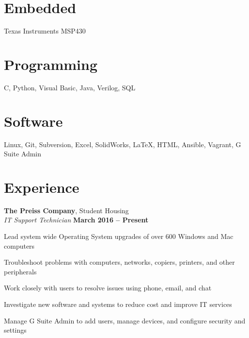 \documentclass[margin,line]{resume}
\begin{document}
\address{4232 Palafox Ct. Raleigh, NC 27604 | (704) 799-5153 | jesseaster1@gmail.com}
\begin{resume}

   
    \section{\mysidestyle Embedded}
    Texas Instruments MSP430
    \vspace{-5mm}
    
    \section{\mysidestyle Programming}
    C, Python, Visual Basic, Java, Verilog, SQL
    \vspace{-5mm}

    \section{\mysidestyle Software}
    Linux, Git, Subversion, Excel, SolidWorks, \LaTeX, HTML, Ansible, Vagrant, G Suite Admin

    \section{\mysidestyle Experience}


    \textbf{The Preiss Company}, Student Housing\\
    \textsl{IT Support Technician}  \hfill \textbf{March 2016 -- Present}\\
    \vspace{-4mm}
    \begin{list2}
    \item Lead system wide Operating System upgrades of over 600 Windows and Mac computers
    \item Troubleshoot problems with computers, networks, copiers, printers, and other peripherals

    \item Work closely with users to resolve issues using phone, email, and chat
    \item Investigate new software and systems to reduce cost and improve IT services
    \item  Manage G Suite Admin to add users, manage devices, and configure security and settings


\end{list2}
\end{resume}
\end{document}
